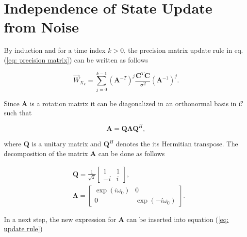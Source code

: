 \documentclass[11pt,a4paper,twoside]{report}
\newcommand{\messF}[3]{\overrightarrow{#1}_{{#2}_{k{#3}}}}
\newcommand{\mat}[1]{\mathbf{#1}}
\begin{document}
\chapter*{Independence of State Update from Noise}
By induction and for a time index $k>0$, the precision matrix update rule in eq. (\ref{eq: precision matrix}) can be written as follows

\begin{equation}
	\label{eq: update rule}
	\messF{W}{X}{} = \sum_{j=0}^{k-1}\left(\mat{A}^{-T}\right)^j\frac{\mat{C}^T\mat{C}}{\sigma^2}\left(\mat{A}^{-1}\right)^{j}.
\end{equation}

Since $\mat{A}$ is a rotation matrix it can be diagonalized in an orthonormal basis in $\mathcal{C}$ such that

\begin{equation}
	\mat{A} = \mat{Q\Lambda}\mat{Q}^H,
\end{equation}

where $\mat{Q}$ is a unitary matrix and $\mat{Q}^H$ denotes the its Hermitian transpose. The decomposition of the matrix $\mat{A}$ can be done as follows

\begin{align*}
	&\mat{Q} = \frac{1}{\sqrt{2}}
		\begin{bmatrix}
			1 & 1 \\
			-i & i
		\end{bmatrix},
	\\
	&\mat{\Lambda} = 
		\begin{bmatrix}
			\exp{(i\omega_0)} & 0 \\
			0 & \exp{(-i\omega_0)}
		\end{bmatrix}.
\end{align*}

In a next step, the new expression for $\mat{A}$ can be inserted into equation (\ref{eq: update rule}) \cite{ST:Malmberg}
\end{document}
